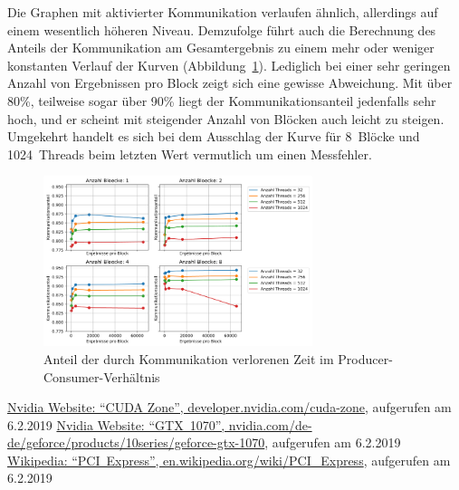 \documentclass[11pt, abstract=on]{scrartcl}
\begin{document}
Die Graphen mit aktivierter Kommunikation verlaufen ähnlich, allerdings auf einem wesentlich höheren Niveau. Demzufolge führt auch die Berechnung des Anteils der Kommunikation am Gesamtergebnis zu einem mehr oder weniger konstanten Verlauf der Kurven (Abbildung~\ref{fig:KommunikationAnteil}). Lediglich bei einer sehr geringen Anzahl von Ergebnissen pro Block zeigt sich eine gewisse Abweichung. Mit über 80\%, teilweise sogar über 90\% liegt der Kommunikationsanteil jedenfalls sehr hoch, und er scheint mit steigender Anzahl von Blöcken auch leicht zu steigen. Umgekehrt handelt es sich bei dem Ausschlag der Kurve für 8~Blöcke und 1024~Threads beim letzten Wert vermutlich um einen Messfehler.
\begin{figure} [htbp]
 	\centering
 		\includegraphics[width=0.7\textwidth]{Graph_KommunikationAnteil.png}
 	\caption{Anteil der durch Kommunikation verlorenen Zeit im Producer-Consumer-Verhältnis}
 	\label{fig:KommunikationAnteil}
\end{figure}

\pagebreak
\begin{thebibliography}{99}
	  \href{https://developer.nvidia.com/cuda-zone}{Nvidia Website: ``CUDA Zone'', developer.nvidia.com/cuda-zone}, aufgerufen am 6.2.2019
	  \href{https://www.nvidia.com/de-de/geforce/products/10series/geforce-gtx-1070/}{Nvidia Website: ``GTX~1070'', nvidia.com/de-de/geforce/products/10series/geforce-gtx-1070}, aufgerufen am 6.2.2019
	  \href{https://en.wikipedia.org/wiki/PCI_Express}{Wikipedia: ``PCI~Express'', en.wikipedia.org/wiki/PCI\_Express}, aufgerufen am 6.2.2019
\end{thebibliography}
\end{document}
